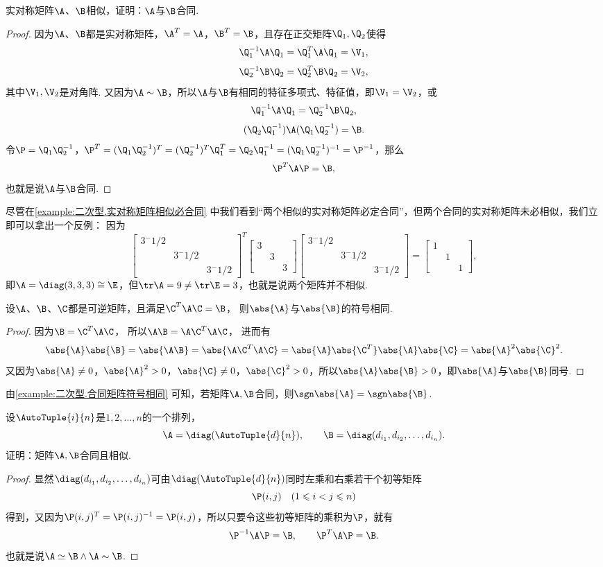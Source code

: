 \begin{example}\label{example:二次型.实对称矩阵相似必合同}
实对称矩阵\(\A\)、\(\B\)相似，证明：\(\A\)与\(\B\)合同.
\begin{proof}
因为\(\A\)、\(\B\)都是实对称矩阵，\(\A^T=\A\)，\(\B^T=\B\)，且存在正交矩阵\(\Q_1,\Q_2\)使得\[
\Q_1^{-1} \A \Q_1 = \Q_1^T \A \Q_1 = \V_1,
\]\[
\Q_2^{-1} \B \Q_2 = \Q_2^T \B \Q_2 = \V_2,
\]其中\(\V_1,\V_2\)是对角阵.
又因为\(\A\sim\B\)，所以\(\A\)与\(\B\)有相同的特征多项式、特征值，即\(\V_1=\V_2\)，或\[
\Q_1^{-1} \A \Q_1 = \Q_2^{-1} \B \Q_2,
\]\[
(\Q_2 \Q_1^{-1}) \A (\Q_1 \Q_2^{-1}) = \B.
\]令\(\P = \Q_1 \Q_2^{-1}\)，\(\P^T = (\Q_1 \Q_2^{-1})^T = (\Q_2^{-1})^T \Q_1^T = \Q_2 \Q_1^{-1} = (\Q_1 \Q_2^{-1})^{-1} = \P^{-1}\)，那么\[
\P^T \A \P = \B,
\]也就是说\(\A\)与\(\B\)合同.
\end{proof}
\end{example}

\begin{example}
尽管在\cref{example:二次型.实对称矩阵相似必合同} 中我们看到“两个相似的实对称矩阵必定合同”，但两个合同的实对称矩阵未必相似，我们立即可以拿出一个反例：
\def\diagx(#1){\begin{bmatrix} #1 \\ & #1 \\ && #1 \end{bmatrix}}%
因为\[
\diagx(3^{-1/2})^T \diagx(3) \diagx(3^{-1/2}) = \diagx(1),
\]即\(\A = \diag(3,3,3) \cong \E\)，但\(\tr\A = 9 \neq \tr\E = 3\)，也就是说两个矩阵并不相似.
\end{example}

\begin{example}\label{example:二次型.合同矩阵符号相同}
设\(\A\)、\(\B\)、\(\C\)都是可逆矩阵，且满足\(\C^T\A\C=\B\)，%
则\(\abs{\A}\)与\(\abs{\B}\)的符号相同.
\begin{proof}
因为\(\B=\C^T\A\C\)，%
所以\(\A\B=\A\C^T\A\C\)，%
进而有\[
\abs{\A}\abs{\B}
=\abs{\A\B}
=\abs{\A\C^T\A\C}
=\abs{\A}\abs{\C^T}\abs{\A}\abs{\C}
=\abs{\A}^2\abs{\C}^2.
\]
又因为\(\abs{\A} \neq 0\)，\(\abs{\A}^2 > 0\)，\(\abs{\C} \neq 0\)，\(\abs{\C}^2 > 0\)，所以\(\abs{\A}\abs{\B} > 0\)，即\(\abs{\A}\)与\(\abs{\B}\)同号.
\end{proof}
\end{example}
由\cref{example:二次型.合同矩阵符号相同} 可知，若矩阵\(\A,\B\)合同，则\(\sgn\abs{\A}=\sgn\abs{\B}\).

\begin{example}
设\(\AutoTuple{i}{n}\)是\(1,2,\dotsc,n\)的一个排列，%
\[
\A=\diag(\AutoTuple{d}{n}),
\qquad
\B=\diag(d_{i_1},d_{i_2},\dotsc,d_{i_n}).
\]
证明：矩阵\(\A,\B\)合同且相似.
\begin{proof}
显然\(\diag(d_{i_1},d_{i_2},\dotsc,d_{i_n})\)可由\(\diag(\AutoTuple{d}{n})\)同时左乘和右乘若干个初等矩阵\[
\P(i,j) \quad(1 \leqslant i < j \leqslant n)
\]得到，又因为\(\P(i,j)^T = \P(i,j)^{-1} = \P(i,j)\)，所以只要令这些初等矩阵的乘积为\(\P\)，就有\[
\P^{-1} \A \P = \B,
\qquad
\P^T \A \P = \B.
\]也就是说\(\A\simeq\B\land\A\sim\B\).
\end{proof}
\end{example}

